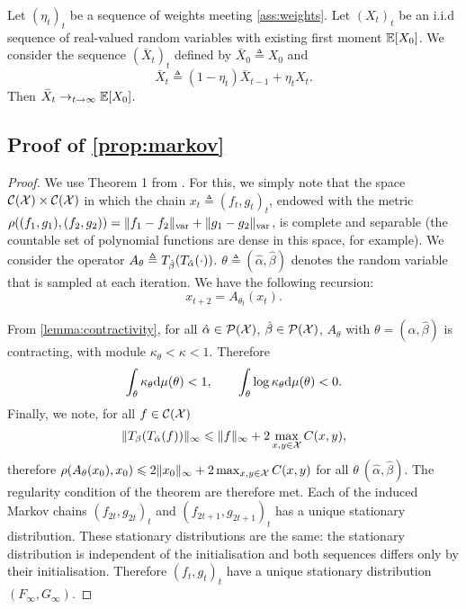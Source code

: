 \begin{lemma}\label{lemma:running}
    Let $(\eta_t)_t$ be a sequence of weights meeting \autoref{ass:weights}. Let
    $(X_t)_t$ be an i.i.d sequence of real-valued random variables with existing
    first moment $\mathbb{E}[X_0]$. We consider the sequence ${(\bar X_t)}_t$ defined
    by $\bar X_0 \triangleq X_0$ and 
    \begin{equation}
        \bar X_t \triangleq (1 - \eta_t) \bar X_{t-1} + \eta_t X_t.
    \end{equation}
    Then $\bar X_t \to_{t \to \infty} \mathbb{E}[X_0]$.
\end{lemma}

\subsection{Proof of \autoref{prop:markov}}\label{sec:proof_markov}

\begin{proof}
    We use Theorem 1 from \citet{diaconis_iterated}. For this, we simply note
    that the space $\mathcal{C}(\mathcal{X}) \times \mathcal{C}(\mathcal{X})$ in which the chain ${x_t
    \triangleq (f_t, g_t)}_t$, endowed with the metric $\rho((f_1, g_1), (f_2,
    g_2)) = \Vert f_1 - f_2 \Vert_{\text{\upshape var}} + \Vert g_1 - g_2 \Vert_{\text{\upshape var}}$, is
    complete and separable (the countable set of polynomial functions are dense in this space, for example).
    We consider the operator $A_{\theta} \triangleq T_{\hat \beta}(T_{\hat
    \alpha}(\cdot))$. $\theta \triangleq (\hat \alpha, \hat \beta)$ denotes
    the random variable that is sampled at each iteration. We have the following
    recursion:
    \begin{equation}
        x_{t+2} = A_{\theta_t}(x_t).
    \end{equation}
    
    From \autoref{lemma:contractivity}, for all $\hat \alpha \in \mathcal{P}(\mathcal{X})$, $\hat \beta \in \mathcal{P}(\mathcal{X})$, $A_{\theta}$
    with $\theta = (\hat \alpha, \hat \beta)$ is contracting, with module
    $\kappa_\theta < \kappa < 1$. Therefore
    \begin{equation}
        \int_{\theta} \kappa_\theta \textrm{d} \mu(\theta) < 1, \qquad \int_{\theta}
         \log \kappa_\theta \textrm{d} \mu(\theta) < 0.
    \end{equation}
    Finally, we note, for all $f \in \mathcal{C}(\mathcal{X})$
    \begin{equation}
        \Vert T_{\beta}(T_{\hat \alpha}(f)) \Vert_{\infty} 
        \leqslant \Vert f \Vert_\infty + 2 \max_{x,y \in \mathcal{X}} C(x, y),
    \end{equation}
    therefore $\rho(A_\theta(x_0), x_0) \leqslant 2 \Vert x_0 \Vert_\infty + 2
    \max_{x,y \in \mathcal{X}} C(x, y)$ for all $\theta \ (\hat \alpha, \hat \beta)$.
    The regularity condition of the theorem are therefore met. Each of the
    induced Markov chains ${(f_{2t}, g_{2t})}_t$ and ${(f_{2t + 1}, g_{2t +
    1})}_t$ has a unique stationary distribution. These stationary distributions
    are the same: the stationary distribution is independent of the
    initialisation and both sequences differs only by their initialisation.
    Therefore ${(f_{t}, g_{t})}_t$ have a unique stationary distribution
    $(F_\infty, G_\infty)$.
\end{proof}

